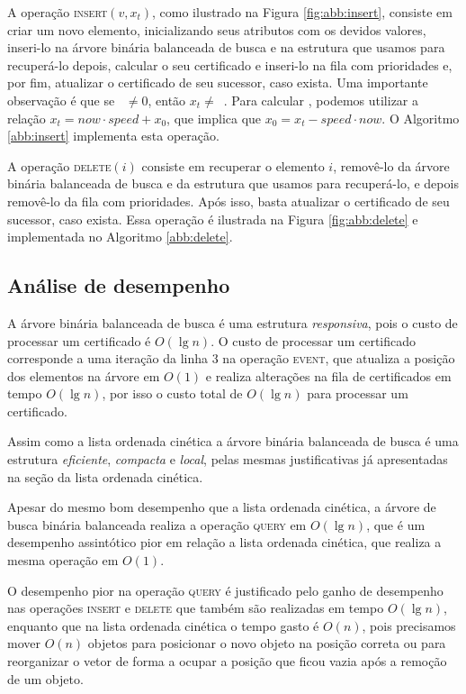 A operação \textsc{insert}$(v, x_t)$, como ilustrado na Figura
\ref{fig:abb:insert}, consiste em criar um novo elemento,
inicializando seus atributos com os devidos valores, inseri-lo na
árvore binária balanceada de busca e na estrutura que usamos para
recuperá-lo depois, calcular o seu certificado e inseri-lo na fila
com prioridades e, por fim, atualizar o certificado de seu sucessor,
caso exista. Uma importante observação é que se \now~$\neq 0$, então
$x_t \neq$~\initv. Para calcular \initv, podemos utilizar a relação
${x_t = now\cdot speed + x_0}$, que implica que ${x_0 = x_t -
speed\cdot now}$. O Algoritmo \ref{abb:insert} implementa esta
operação.





A operação \textsc{delete}$(i)$ consiste em recuperar o elemento
$i$, removê-lo da árvore binária balanceada de busca e da estrutura
que usamos para recuperá-lo, e depois removê-lo da fila com
prioridades. Após isso, basta atualizar o certificado de seu
sucessor, caso exista. Essa operação é ilustrada na Figura
\ref{fig:abb:delete} e implementada no Algoritmo \ref{abb:delete}.



\FloatBarrier

\subsection{Análise de desempenho}

A árvore binária balanceada de busca é uma estrutura \textit{responsiva}, pois o
custo de processar um certificado é $O(\lg{n})$. O custo de processar um
certificado corresponde a uma iteração da linha $3$ na operação \textsc{event},
que atualiza a posição dos elementos na árvore em $O(1)$ e realiza alterações na
fila de certificados em tempo $O(\lg{n})$, por isso o custo total de $O(\lg{n})$
para processar um certificado.

Assim como a lista ordenada cinética a árvore binária balanceada de busca é uma
estrutura \textit{eficiente}, \textit{compacta} e \textit{local}, pelas mesmas
justificativas já apresentadas na seção da lista ordenada cinética.

Apesar do mesmo bom desempenho que a lista ordenada cinética, a árvore de busca
binária balanceada realiza a operação \textsc{query} em $O(\lg{n})$, que é um
desempenho assintótico pior em relação a lista ordenada cinética, que realiza a
mesma operação em $O(1)$.

O desempenho pior na operação \textsc{query} é justificado pelo ganho de
desempenho nas operações \textsc{insert} e \textsc{delete} que também são
realizadas em tempo $O(\lg{n})$, enquanto que na lista ordenada cinética o tempo
gasto é $O(n)$, pois precisamos mover $O(n)$ objetos para posicionar o novo
objeto na posição correta ou para reorganizar o vetor de forma a ocupar a
posição que ficou vazia após a remoção de um objeto. 
